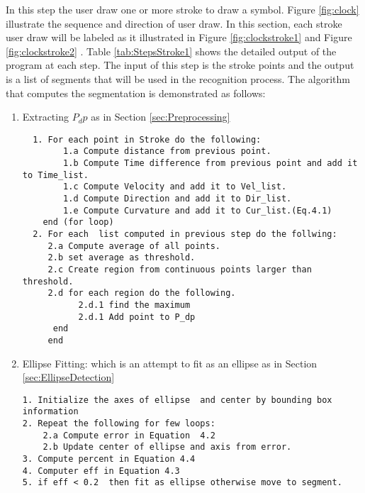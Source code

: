 In this step the user draw one or more stroke to draw a symbol. Figure \ref{fig:clock} illustrate the sequence and direction of user draw. In this section, each stroke user draw will be labeled as it illustrated in Figure \ref{fig:clockstroke1} and Figure \ref{fig:clockstroke2} . Table \ref{tab:StepsStroke1} shows the detailed output of the program at each step. The input of this step is the stroke points and the output is a list of segments that will be used in the recognition process. The algorithm that computes the segmentation is demonstrated as follows:
\begin{enumerate}

	\item Extracting $P_dp$ as in Section \ref{sec:Preprocessing}
\begin{verbatim}
  1. For each point in Stroke do the following:
  		1.a Compute distance from previous point.
  		1.b Compute Time difference from previous point and add it to Time_list.  
  		1.c Compute Velocity and add it to Vel_list. 
  		1.d Compute Direction and add it to Dir_list.
  	 	1.e Compute Curvature and add it to Cur_list.(Eq.4.1) 
  	end (for loop)
  2. For each  list computed in previous step do the follwing:   
  	 2.a Compute average of all points. 
  	 2.b set average as threshold.  
  	 2.c Create region from continuous points larger than threshold. 
  	 2.d for each region do the following. 
  	 	   2.d.1 find the maximum 
  	 	   2.d.1 Add point to P_dp 
  	  end
     end 
\end{verbatim}	
\item Ellipse Fitting: which is an attempt to fit as an ellipse as in Section \ref{sec:EllipseDetection} 
\begin{verbatim}
1. Initialize the axes of ellipse  and center by bounding box information
2. Repeat the following for few loops: 
	2.a Compute error in Equation  4.2 
	2.b Update center of ellipse and axis from error. 
3. Compute percent in Equation 4.4 
4. Computer eff in Equation 4.3 
5. if eff < 0.2  then fit as ellipse otherwise move to segment. 
\end{verbatim}	


\end{enumerate}
